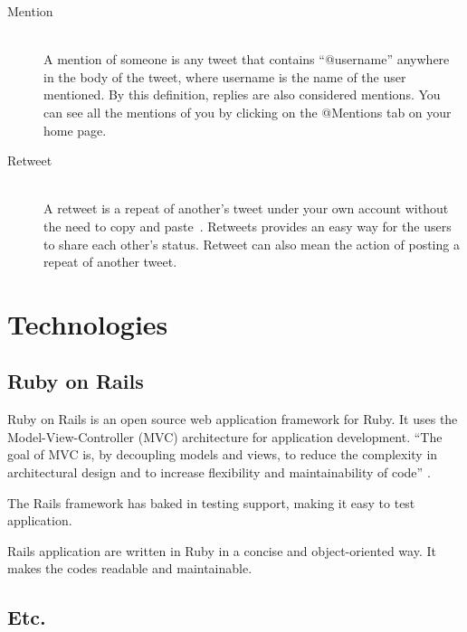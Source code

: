 \begin{description}
\item[Mention] \hfill \\
 A mention of someone is any tweet that
  contains ``@username'' anywhere in the body of the tweet, where
  username is the name of the user mentioned. By this definition,
  replies are also considered mentions. You can see all the mentions
  of you by clicking on the @Mentions tab on your home page.

\item[Retweet] \hfill \\
A retweet is a repeat of another’s tweet under
  your own account without the need to copy and paste~\cite{morris09}.
  Retweets provides an easy way for the users to share each other's
  status. Retweet can also mean the action of posting a repeat of
  another tweet.

\end{description}

\section{Technologies}

\subsection{Ruby on Rails} %
\label{sub:ruby_on_rails}

Ruby on Rails is an open source web application framework for Ruby. It uses the Model-View-Controller (MVC) architecture for application development. ``The goal of MVC is, by decoupling models and views, to reduce the complexity in architectural design and to increase flexibility and maintainability of code'' \cite{wiki_mvc}.

The Rails framework has baked in testing support, making it easy to test application.

Rails application are written in Ruby in a concise and object-oriented way. It makes the codes readable and maintainable.

\subsection{Etc.}


